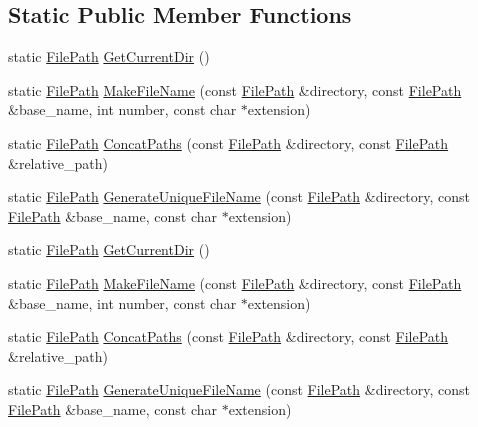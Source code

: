 \subsection*{\-Static \-Public \-Member \-Functions}
\begin{DoxyCompactItemize}
\item 
static \hyperlink{classtesting_1_1internal_1_1FilePath}{\-File\-Path} \hyperlink{classtesting_1_1internal_1_1FilePath_a8f7fb543b08e0e79edaaa2829c1cb808}{\-Get\-Current\-Dir} ()
\item 
static \hyperlink{classtesting_1_1internal_1_1FilePath}{\-File\-Path} \hyperlink{classtesting_1_1internal_1_1FilePath_a56b8e4a3bdcf00693fb761b47689dd92}{\-Make\-File\-Name} (const \hyperlink{classtesting_1_1internal_1_1FilePath}{\-File\-Path} \&directory, const \hyperlink{classtesting_1_1internal_1_1FilePath}{\-File\-Path} \&base\-\_\-name, int number, const char $\ast$extension)
\item 
static \hyperlink{classtesting_1_1internal_1_1FilePath}{\-File\-Path} \hyperlink{classtesting_1_1internal_1_1FilePath_ae8c11e9d5d51f4266c6507aeb34ba55b}{\-Concat\-Paths} (const \hyperlink{classtesting_1_1internal_1_1FilePath}{\-File\-Path} \&directory, const \hyperlink{classtesting_1_1internal_1_1FilePath}{\-File\-Path} \&relative\-\_\-path)
\item 
static \hyperlink{classtesting_1_1internal_1_1FilePath}{\-File\-Path} \hyperlink{classtesting_1_1internal_1_1FilePath_a01f72e14ad442c88e941571cb65228f4}{\-Generate\-Unique\-File\-Name} (const \hyperlink{classtesting_1_1internal_1_1FilePath}{\-File\-Path} \&directory, const \hyperlink{classtesting_1_1internal_1_1FilePath}{\-File\-Path} \&base\-\_\-name, const char $\ast$extension)
\item 
static \hyperlink{classtesting_1_1internal_1_1FilePath}{\-File\-Path} \hyperlink{classtesting_1_1internal_1_1FilePath_a71e70ce40f62579f53df1cbba1a5ee5b}{\-Get\-Current\-Dir} ()
\item 
static \hyperlink{classtesting_1_1internal_1_1FilePath}{\-File\-Path} \hyperlink{classtesting_1_1internal_1_1FilePath_a803fc642e87a6b3ec8a114eea72d3600}{\-Make\-File\-Name} (const \hyperlink{classtesting_1_1internal_1_1FilePath}{\-File\-Path} \&directory, const \hyperlink{classtesting_1_1internal_1_1FilePath}{\-File\-Path} \&base\-\_\-name, int number, const char $\ast$extension)
\item 
static \hyperlink{classtesting_1_1internal_1_1FilePath}{\-File\-Path} \hyperlink{classtesting_1_1internal_1_1FilePath_a5209b1fe0c2927c6862b0c4194fe50bb}{\-Concat\-Paths} (const \hyperlink{classtesting_1_1internal_1_1FilePath}{\-File\-Path} \&directory, const \hyperlink{classtesting_1_1internal_1_1FilePath}{\-File\-Path} \&relative\-\_\-path)
\item 
static \hyperlink{classtesting_1_1internal_1_1FilePath}{\-File\-Path} \hyperlink{classtesting_1_1internal_1_1FilePath_aaf6f103aa0a3e9e8a14749da1bc963c1}{\-Generate\-Unique\-File\-Name} (const \hyperlink{classtesting_1_1internal_1_1FilePath}{\-File\-Path} \&directory, const \hyperlink{classtesting_1_1internal_1_1FilePath}{\-File\-Path} \&base\-\_\-name, const char $\ast$extension)
\end{DoxyCompactItemize}

